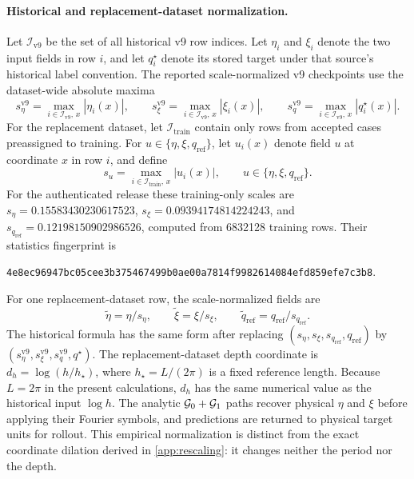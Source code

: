 \paragraph{Historical and replacement-dataset normalization.}
Let $\mathcal I_{\mathrm{v9}}$ be the set of all historical v9 row indices.
Let $\eta_i$ and $\xi_i$ denote the two input fields in row $i$, and let
$q_i^\star$ denote its stored target under that source's historical label
convention.  The reported scale-normalized v9 checkpoints use the
dataset-wide absolute maxima
\begin{equation}
  s_\eta^{\mathrm{v9}}
  =\max_{i\in\mathcal I_{\mathrm{v9}},\,x}|\eta_i(x)|,\qquad
  s_\xi^{\mathrm{v9}}
  =\max_{i\in\mathcal I_{\mathrm{v9}},\,x}|\xi_i(x)|,\qquad
  s_q^{\mathrm{v9}}
  =\max_{i\in\mathcal I_{\mathrm{v9}},\,x}|q_i^\star(x)|.
  \label{eq:paper-v9-scales}
\end{equation}
For the replacement dataset, let $\mathcal I_{\mathrm{train}}$ contain only rows
from accepted cases preassigned to training.  For
$u\in\{\eta,\xi,q_{\mathrm{ref}}\}$, let $u_i(x)$ denote field $u$ at
coordinate $x$ in row $i$, and define
\begin{equation}
  s_u
  =
  \max_{i\in\mathcal I_{\mathrm{train}},\,x}|u_i(x)|,
  \qquad
  u\in\{\eta,\xi,q_{\mathrm{ref}}\}.
  \label{eq:paper-training-scales}
\end{equation}
For the authenticated release these training-only scales are
\(s_\eta=0.15583430230617523\),
\(s_\xi=0.09394174814224243\), and
\(s_{q_{\mathrm{ref}}}=0.12198150902986526\), computed from
\num{6832128} training rows.  Their statistics fingerprint is
\begin{center}
\small
\texttt{4e8ec96947bc05cee3b375467499b0ae00a7814f9982614084efd859efe7c3b8}.
\end{center}
For one replacement-dataset row, the scale-normalized fields are
\begin{equation}
  \widetilde\eta=\eta/s_\eta,\qquad
  \widetilde\xi=\xi/s_\xi,\qquad
  \widetilde q_{\mathrm{ref}}=q_{\mathrm{ref}}/s_{q_{\mathrm{ref}}}.
  \label{eq:normalization}
\end{equation}
The historical formula has the same form after replacing
$(s_\eta,s_\xi,s_{q_{\mathrm{ref}}},q_{\mathrm{ref}})$ by
$(s_\eta^{\mathrm{v9}},s_\xi^{\mathrm{v9}},s_q^{\mathrm{v9}},q^\star)$.
The replacement-dataset depth coordinate is
$d_h=\log(h/h_\star)$, where $h_\star=L/(2\pi)$ is a fixed reference length.
Because $L=2\pi$ in the present calculations, $d_h$ has the same numerical
value as the historical input $\log h$.  The analytic $\mathcal{G}_0+\mathcal{G}_1$ paths
recover physical $\eta$ and $\xi$ before applying their Fourier symbols, and
predictions are returned to physical target units for rollout.  This
empirical normalization is distinct from the exact coordinate dilation
derived in \cref{app:rescaling}: it changes neither the period nor the depth.

